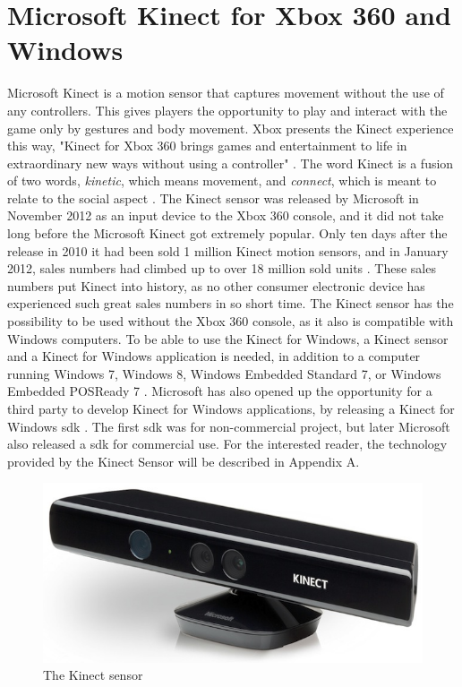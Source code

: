 \section{Microsoft Kinect for Xbox 360 and Windows}
Microsoft Kinect is a motion sensor that captures movement without the use of any controllers. This gives players the opportunity to play and interact with the game only by gestures and body movement. Xbox presents the Kinect experience this way, "Kinect for Xbox 360 brings games and entertainment to life in extraordinary new ways without using a controller" \cite{kinectxboxdef}. The word Kinect is a fusion of two words, \emph{kinetic}, which means movement, and \emph{connect}, which is meant to relate to the social aspect \cite{howstuffworksKinect}. The Kinect sensor was released by Microsoft in November 2012 as an input device to the Xbox 360 console, and it did not take long before the Microsoft Kinect got extremely popular. Only ten days after the release in 2010 it had been sold 1 million Kinect motion sensors, and in January 2012, sales numbers had climbed up to over 18 million sold units \cite{kinectsales}. These sales numbers put Kinect into history, as no other consumer electronic device has experienced such great sales numbers in so short time. The Kinect sensor has the possibility to be used without the Xbox 360 console, as it also is compatible with Windows computers. To be able to use the Kinect for Windows, a Kinect sensor and a Kinect for Windows application is needed, in addition to a computer running Windows 7, Windows 8, Windows Embedded Standard 7, or Windows Embedded POSReady 7 \cite{kinectforwindows}. Microsoft has also opened up the opportunity for a third party to develop Kinect for Windows applications, by releasing a Kinect for Windows \ac{sdk} \cite{kinectforwindows}. The first \ac{sdk} was for non-commercial project, but later Microsoft also released a \ac{sdk} for commercial use. For the interested reader, the technology provided by the Kinect Sensor will be described in Appendix A.

\begin{figure} [ht!]
\centering
\includegraphics[scale=0.4]{kinect.jpg}
\caption{The Kinect sensor}
\label{kinectsensor}
\end{figure} 
 
